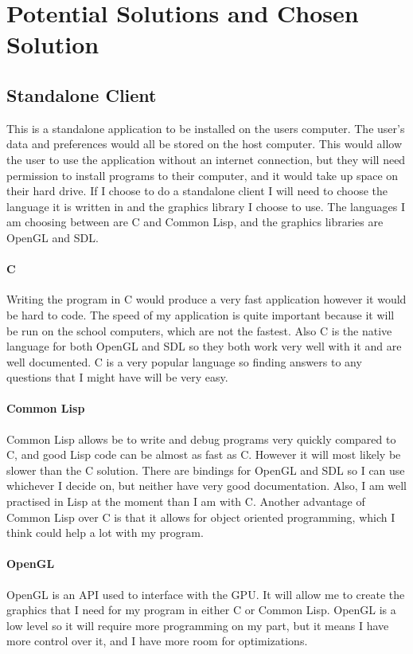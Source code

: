 \section{Potential Solutions and Chosen Solution}

\subsection{Standalone Client}
This is a standalone application to be installed on the users computer. The
user's data and preferences would all be stored on the host computer. This would
allow the user to use the application without an internet connection, but they
will need permission to install programs to their computer, and it would take up
space on their hard drive. If I choose to do a standalone client I will need to
choose the language it is written in and the graphics library I choose to use.
The languages I am choosing between are C and Common Lisp, and the graphics
libraries are OpenGL and SDL.

\paragraph{C}
Writing the program in C would produce a very fast application however it would
be hard to code. The speed of my application is quite important because it will
be run on the school computers, which are not the fastest. Also C is the native
language for both OpenGL and SDL so they both work very well with it and are
well documented. C is a very popular language so finding answers to any
questions that I might have will be very easy.

\paragraph{Common Lisp} 
Common Lisp allows be to write and debug programs very quickly compared to C,
and good Lisp code can be almost as fast as C. However it will most likely be
slower than the C solution. There are bindings for OpenGL and SDL so I can use
whichever I decide on, but neither have very good documentation. Also, I am well
practised in Lisp at the moment than I am with C. Another advantage of Common
Lisp over C is that it allows for object oriented programming, which I think
could help a lot with my program.

\paragraph{OpenGL}
OpenGL is an API used to interface with the GPU. It will allow me to create the
graphics that I need for my program in either C or Common Lisp. OpenGL is a low
level so it will require more programming on my part, but it means I have
more control over it, and I have more room for optimizations.

